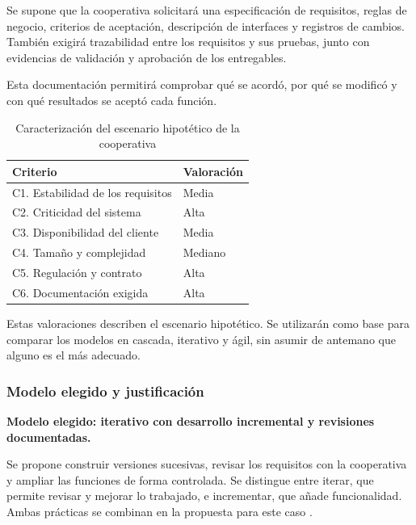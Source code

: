 Se supone que la cooperativa solicitará una especificación de requisitos, reglas de negocio, criterios de aceptación, descripción de interfaces y registros de cambios. También exigirá trazabilidad entre los requisitos y sus pruebas, junto con evidencias de validación y aprobación de los entregables.

Esta documentación permitirá comprobar qué se acordó, por qué se modificó y con qué resultados se aceptó cada función.

\begin{table}[H]
	\centering
	\footnotesize
	\caption{Caracterización del escenario hipotético de la cooperativa}
	\label{tab:escenario-cooperativa}
	\begin{tabularx}{\textwidth}{@{}Yp{0.22\textwidth}@{}}
		\toprule
		\textbf{Criterio} & \textbf{Valoración} \\
		\midrule
		C1. Estabilidad de los requisitos & Media \\
		C2. Criticidad del sistema & Alta \\
		C3. Disponibilidad del cliente & Media \\
		C4. Tamaño y complejidad & Mediano \\
		C5. Regulación y contrato & Alta \\
		C6. Documentación exigida & Alta \\
		\bottomrule
	\end{tabularx}
\end{table}

Estas valoraciones describen el escenario hipotético. Se utilizarán como base para comparar los modelos en cascada, iterativo y ágil, sin asumir de antemano que alguno es el más adecuado.

\subsubsection{Modelo elegido y justificación}

\textbf{Modelo elegido: iterativo con desarrollo incremental y revisiones documentadas.}

Se propone construir versiones sucesivas, revisar los requisitos con la cooperativa y ampliar las funciones de forma controlada. Se distingue entre iterar, que permite revisar y mejorar lo trabajado, e incrementar, que añade funcionalidad. Ambas prácticas se combinan en la propuesta para este caso \cite{sommerville2016}.

